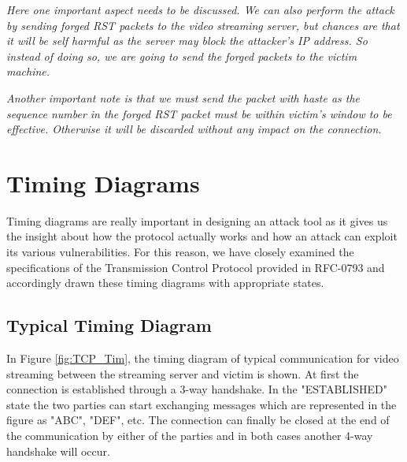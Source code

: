 \documentclass[14pt]{extarticle}
\begin{document}
    \label{sec:strategy}
    
    \textsl{Here one important aspect needs to be discussed. We can also perform the attack by sending forged RST packets to the video streaming server, but chances are that it will be self harmful as the server may block the attacker's IP address. So instead of doing so, we are going to send the forged packets to the victim machine.} 
    
    \textsl{Another important note is that we must send the packet with haste as the sequence number in the forged RST packet must be within victim's window to  be effective. Otherwise it will be discarded without any impact on the connection.}
  

\section{Timing Diagrams}
    Timing diagrams are really important in designing an attack tool as it gives us the insight about how the protocol actually works and how an attack can exploit its various vulnerabilities. For this reason, we have closely examined the specifications of the Transmission Control Protocol provided in RFC-0793 and accordingly drawn these timing diagrams with appropriate states.
    
    \subsection{Typical Timing Diagram}
        In Figure \ref{fig:TCP_Tim}, the timing diagram of typical communication for video streaming between the streaming server and victim is shown. At first the connection is established through a 3-way handshake. In the "ESTABLISHED" state the two parties can start exchanging messages which are represented in the figure as "ABC", "DEF", etc. The connection can finally be closed at the end of the communication by either of the parties and in both cases another 4-way handshake will occur. 
        
\end{document}
